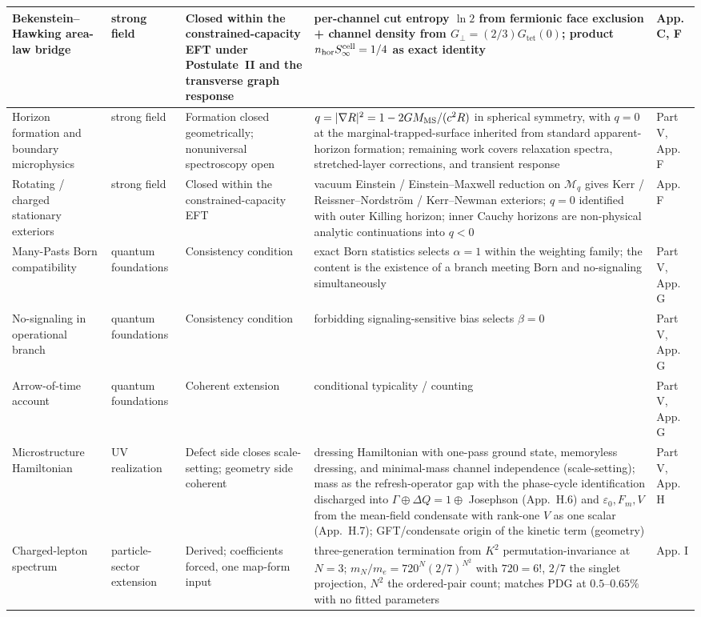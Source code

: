 \documentclass[11pt]{article}
\begin{document}
\begin{longtable}{|L{0.18\textwidth}|L{0.13\textwidth}|L{0.16\textwidth}|L{0.33\textwidth}|L{0.13\textwidth}|}
\hline
Bekenstein--Hawking area-law bridge & strong field & Closed within the constrained-capacity EFT under Postulate~II and the transverse graph response & per-channel cut entropy $\ln 2$ from fermionic face exclusion + channel density from $G_\perp=(2/3)G_{\mathrm{tet}}(0)$; product $n_{\rm hor}S_\infty^{\rm cell}=1/4$ as exact identity & App. C, F \\
\hline
Horizon formation and boundary microphysics & strong field & Formation closed geometrically; nonuniversal spectroscopy open & $q=|\nabla R|^2=1-2GM_{\rm MS}/(c^2R)$ in spherical symmetry, with $q=0$ at the marginal-trapped-surface inherited from standard apparent-horizon formation; remaining work covers relaxation spectra, stretched-layer corrections, and transient response & Part V, App. F \\
\hline
Rotating / charged stationary exteriors & strong field & Closed within the constrained-capacity EFT & vacuum Einstein / Einstein--Maxwell reduction on $\mathcal{M}_q$ gives Kerr / Reissner--Nordstr\"om / Kerr--Newman exteriors; $q=0$ identified with outer Killing horizon; inner Cauchy horizons are non-physical analytic continuations into $q<0$ & App. F \\
\hline
Many-Pasts Born compatibility & quantum foundations & Consistency condition & exact Born statistics selects $\alpha=1$ within the weighting family; the content is the existence of a branch meeting Born and no-signaling simultaneously & Part V, App. G \\
\hline
No-signaling in operational branch & quantum foundations & Consistency condition & forbidding signaling-sensitive bias selects $\beta=0$ & Part V, App. G \\
\hline
Arrow-of-time account & quantum foundations & Coherent extension & conditional typicality / counting & Part V, App. G \\
\hline
Microstructure Hamiltonian & UV realization & Defect side closes scale-setting; geometry side coherent & dressing Hamiltonian with one-pass ground state, memoryless dressing, and minimal-mass channel independence (scale-setting); mass as the refresh-operator gap with the phase-cycle identification discharged into $\Gamma\oplus\Delta Q{=}1\oplus$ Josephson (App.~H.6) and $\varepsilon_0,F_m,V$ from the mean-field condensate with rank-one $V$ as one scalar (App.~H.7); GFT/condensate origin of the kinetic term (geometry) & Part V, App. H \\
\hline
Charged-lepton spectrum & particle-sector extension & Derived; coefficients forced, one map-form input & three-generation termination from $K^2$ permutation-invariance at $N=3$; $m_N/m_e=720^N(2/7)^{N^2}$ with $720=6!$, $2/7$ the singlet projection, $N^2$ the ordered-pair count; matches PDG at $0.5\text{--}0.65\%$ with no fitted parameters & App. I \\

\end{longtable}
\end{document}
